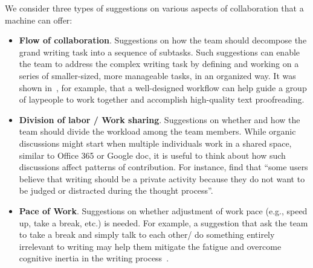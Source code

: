 We consider three types of suggestions on various aspects of collaboration that a machine can offer:


\begin{itemize}[leftmargin=*]
	\item {\bf Flow of collaboration}. Suggestions on how the team should decompose the grand writing task into a sequence of subtasks. Such suggestions can enable the team to address the complex writing task by defining and working on a series of smaller-sized, more manageable tasks, in an organized way. It was shown in~\citet{bernstein2010soylent}, for example, that a well-designed workflow can help guide a group of laypeople to work together and accomplish high-quality text proofreading. 
	\item {\bf Division of labor / Work sharing}. Suggestions on whether and how the team should divide the workload among the team members. 
    While organic discussions might start when multiple individuals work in a shared space, similar to Office 365 or Google doc,
    it is useful to think about how such discussions affect patterns of contribution.
    For instance, \citet{wang2017users} find that ``some users believe that writing should be a private activity because they do not want to be judged or distracted during the thought process''.
	\item {\bf Pace of Work}. Suggestions on whether adjustment of work pace (e.g., speed up, take a break, etc.) is needed. For example, a suggestion that ask the team to take a break and simply talk to each other/ do something entirely irrelevant to writing may help them mitigate the fatigue and overcome cognitive inertia in the writing process~\citep{dai2015and}.


\end{itemize}
